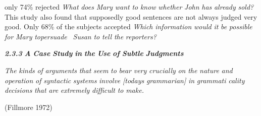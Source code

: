\begin{styleStandard}
only 74\% rejected \textit{What}\textit{ }\textit{does}\textit{ }\textit{Mary}\textit{ }\textit{want}\textit{ }\textit{to}\textit{ }\textit{know}\textit{ }\textit{whether}\textit{ }\textit{John}\textit{ }\textit{has}\textit{ }\textit{already}\textit{ }\textit{sold?}\textit{ }This study also found that supposedly good sentences are not always judged very good. Only 68\% of the subjects accepted \textit{Which}\textit{ }\textit{information}\textit{ }\textit{would}\textit{ }\textit{it}\textit{ }\textit{be}\textit{ }\textit{possible for}\textit{ }\textit{Mary}\textit{ }\textit{t}\textit{o}\textit{persuade }\textit{\ }\textit{Susan}\textit{ }\textit{to}\textit{ }\textit{tell}\textit{ }\textit{the}\textit{ }\textit{reporters?}
\end{styleStandard}


\begin{styleStandard}
\textbf{\textit{2.3.3}}\textbf{\textit{ }}\textbf{\textit{A}}\textbf{\textit{ }}\textbf{\textit{Case}}\textbf{\textit{ }}\textbf{\textit{Study}}\textbf{\textit{ }}\textbf{\textit{in}}\textbf{\textit{ }}\textbf{\textit{the}}\textbf{\textit{ }}\textbf{\textit{Use}}\textbf{\textit{ }}\textbf{\textit{of}}\textbf{\textit{ }}\textbf{\textit{Subtle}}\textbf{\textit{ }}\textbf{\textit{Judgments}}
\end{styleStandard}


\begin{styleStandard}
\textit{The}\textit{ }\textit{kinds}\textit{ }\textit{of}\textit{ }\textit{arguments}\textit{ }\textit{that}\textit{ }\textit{seem}\textit{ }\textit{to}\textit{ }\textit{bear}\textit{ }\textit{very}\textit{ }\textit{crucially}\textit{ }\textit{on}\textit{ }\textit{the}\textit{ }\textit{nature}\textit{ }\textit{and}\textit{ }\textit{operation}\textit{ }\textit{of}\textit{ }\textit{syntactic}\textit{ }\textit{systems}\textit{ }\textit{involve}\textit{ }\textit{[today{\textquotesingle}s}\textit{ }\textit{grammarian]}\textit{ }\textit{in}\textit{ }\textit{grammati\-}\textit{ }\textit{cality}\textit{ }\textit{decisions}\textit{ }\textit{that}\textit{ }\textit{are}\textit{ }\textit{extremely}\textit{ }\textit{difficult}\textit{ }\textit{to}\textit{ }\textit{make.}
\end{styleStandard}


\begin{styleStandard}
(Fillmore 1972)
\end{styleStandard}


